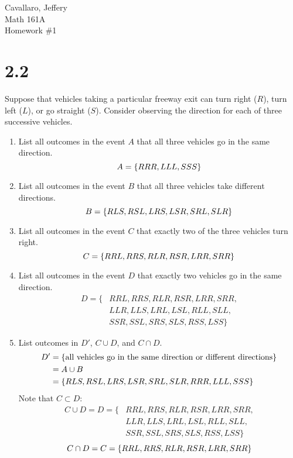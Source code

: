 \documentclass[letterpaper,12pt,fleqn]{article}
\begin{document}
Cavallaro, Jeffery \\
Math 161A \\
Homework \#1

\bigskip

\section*{2.2}

Suppose that vehicles taking a particular freeway exit can turn right (\(R\)), turn left (\(L\)), or go straight (\(S\)).
Consider observing the direction for each of three successive vehicles.
\begin{enumerate}[label=\alph*)]
\item List all outcomes in the event \(A\) that all three vehicles go in the same direction.
  \[A=\{RRR,LLL,SSS\}\]
\item List all outcomes in the event \(B\) that all three vehicles take different directions.
  \[B=\{RLS,RSL,LRS,LSR,SRL,SLR\}\]
\item List all outcomes in the event \(C\) that exactly two of the three vehicles turn right.
  \[C=\{RRL,RRS,RLR,RSR,LRR,SRR\}\]
\item List all outcomes in the event \(D\) that exactly two vehicles go in the same direction.
  \begin{align*}
    D=\{ & RRL,RRS,RLR,RSR,LRR,SRR, \\
    & LLR,LLS,LRL,LSL,RLL,SLL, \\
    & SSR,SSL,SRS,SLS,RSS,LSS \}
  \end{align*}
\item List outcomes in \(D'\), \(C\cup D\), and \(C\cap D\).
  \begin{align*}
    D' &= \{\text{all vehicles go in the same direction or different directions}\} \\
    &= A\cup B \\
    &= \{RLS,RSL,LRS,LSR,SRL,SLR,RRR,LLL,SSS\}
  \end{align*}
  Note that \(C\subset D\):
  \begin{align*}
    C\cup D=D=\{ & RRL,RRS,RLR,RSR,LRR,SRR, \\
    & LLR,LLS,LRL,LSL,RLL,SLL, \\
    & SSR,SSL,SRS,SLS,RSS,LSS \}
  \end{align*}
  \[C\cap D=C=\{RRL,RRS,RLR,RSR,LRR,SRR\}\]
\end{enumerate}

\bigskip
\end{document}
